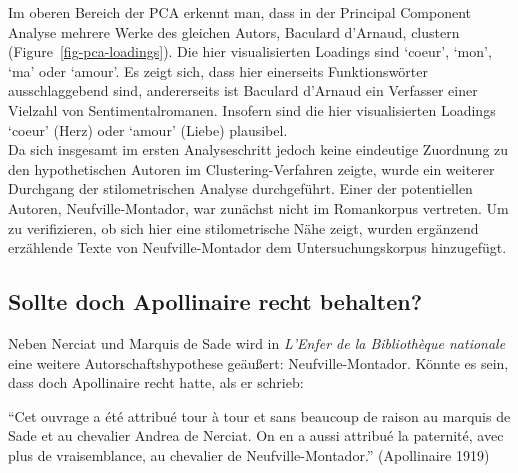 \documentclass[
  12pt,
  letterpaper,
]{classicthesis}
\begin{document}
Im oberen Bereich der PCA erkennt man, dass in der Principal Component
Analyse mehrere Werke des gleichen Autors, Baculard d'Arnaud, clustern
(Figure~\ref{fig-pca-loadings}). Die hier visualisierten Loadings sind
`coeur', `mon', `ma' oder `amour'. Es zeigt sich, dass hier einerseits
Funktionswörter ausschlaggebend sind, andererseits ist Baculard d'Arnaud
ein Verfasser einer Vielzahl von Sentimentalromanen. Insofern sind die
hier visualisierten Loadings `coeur' (Herz) oder `amour' (Liebe)
plausibel.\\
Da sich insgesamt im ersten Analyseschritt jedoch keine eindeutige
Zuordnung zu den hypothetischen Autoren im Clustering-Verfahren zeigte,
wurde ein weiterer Durchgang der stilometrischen Analyse durchgeführt.
Einer der potentiellen Autoren, Neufville-Montador, war zunächst nicht
im Romankorpus vertreten. Um zu verifizieren, ob sich hier eine
stilometrische Nähe zeigt, wurden ergänzend erzählende Texte von
Neufville-Montador dem Untersuchungskorpus hinzugefügt.

\subsection{Sollte doch Apollinaire recht
behalten?}\label{sollte-doch-apollinaire-recht-behalten}

Neben Nerciat und Marquis de Sade wird in \emph{L'Enfer de la
Bibliothèque nationale} eine weitere Autorschaftshypothese geäußert:
Neufville-Montador. Könnte es sein, dass doch Apollinaire recht hatte,
als er schrieb:

``Cet ouvrage a été attribué tour à tour et sans beaucoup de raison au
marquis de Sade et au chevalier Andrea de Nerciat. On en a aussi
attribué la paternité, avec plus de vraisemblance, au chevalier de
Neufville-Montador.'' (Apollinaire 1919)
\end{document}
